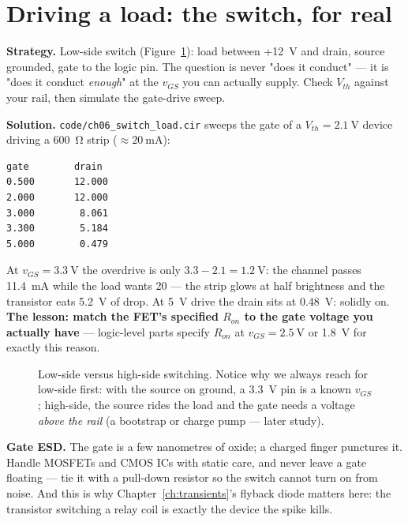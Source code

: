 \section{Driving a load: the switch, for real}
\label{sec:switchload}

\begin{example}\label{ex:gate}
\textbf{Strategy.} Low-side switch (Figure~\ref{fig:lowhigh}): load between
+\qty{12}{\volt} and drain, source grounded, gate to the logic pin. The
question is never "does it conduct" — it is "does it conduct
\emph{enough}" at the $v_{GS}$ you can actually supply. Check $V_{th}$
against your rail, then simulate the gate-drive sweep.

\textbf{Solution.} \texttt{code/ch06\_switch\_load.cir} sweeps the gate of a
$V_{th}=\qty{2.1}{\volt}$ device driving a \qty{600}{\ohm} strip
($\approx\qty{20}{\milli\ampere}$):
\end{example}

\begin{lstlisting}[language={},caption={Gate-drive sweep, verbatim rows --- the transistor turns on only gradually, and \qty{3.3}{\volt} drive leaves it half-on.},label=lst:switchload]
gate        drain
0.500       12.000
2.000       12.000
3.000        8.061
3.300        5.184
5.000        0.479
\end{lstlisting}

At $v_{GS}=\qty{3.3}{\volt}$ the overdrive is only
$3.3-2.1=\qty{1.2}{\volt}$: the channel passes \qty{11.4}{\milli\ampere}
while the load wants 20 — the strip glows at half brightness and the
transistor eats \qty{5.2}{\volt} of drop. At \qty{5}{\volt} drive the drain
sits at \qty{0.48}{\volt}: solidly on. \textbf{The lesson: match the FET's
specified $R_{on}$ to the gate voltage you actually have} — logic-level
parts specify $R_{on}$ at $v_{GS}=\qty{2.5}{\volt}$ or
\qty{1.8}{\volt} for exactly this reason.

\begin{figure}[htbp]
\centering

\caption{Low-side versus high-side switching. Notice why we always reach
for low-side first: with the source on ground, a \qty{3.3}{\volt} pin is a
known $v_{GS}$; high-side, the source rides the load and the gate needs a
voltage \emph{above the rail} (a bootstrap or charge pump — later study).}
\label{fig:lowhigh}
\end{figure}

\begin{checkpoint}
\textbf{Gate ESD.} The gate is a few nanometres of oxide; a
charged finger punctures it. Handle MOSFETs and CMOS ICs with static care,
and never leave a gate floating — tie it with a pull-down resistor so the
switch cannot turn on from noise. And this is why Chapter~\ref{ch:transients}'s
flyback diode matters here: the transistor switching a relay coil is
exactly the device the spike kills.
\end{checkpoint}

